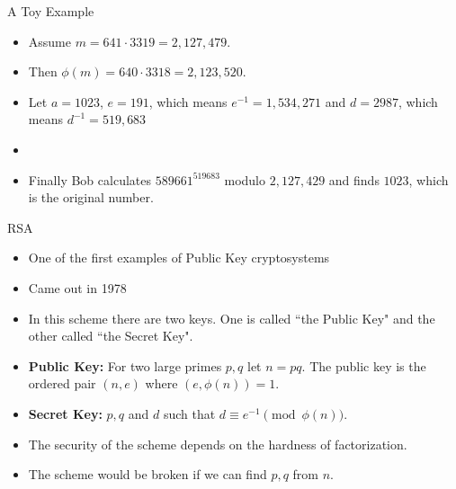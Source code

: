 \documentclass[ %
 usenames,dvipsnames,
aspectratio=169,11pt ]{beamer}
\newenvironment{stepitemize}{\begin{itemize}[<+->]}{\end{itemize} }
\begin{document}
\begin{frame}{A Toy Example}
\begin{stepitemize}
\item Assume $m= 641\cdot 3319=2,127,479.$
\item Then $\phi(m)=640\cdot 3318=2,123,520.$
\item Let $a=1023$, $e=191$, which means $e^{-1} = 1,534,271$ and $d=2987$, which means $d^{-1} = 519,683$
\item[]
\begin{center}
\end{center}
\item Finally Bob calculates $589661^{519683}$ modulo $2,127,429$ and finds $1023$, which is the original number.
\end{stepitemize}
\end{frame}

\begin{frame}{RSA}
\begin{stepitemize}
    \item One of the first examples of Public Key cryptosystems
    \item Came out in 1978
    \item In this scheme there are two keys. One is called ``the Public Key" and the other called ``the Secret Key".
    \item {\bf Public Key:} For two large primes $p, q$ let $n=pq$. The public key is the ordered pair $(n,e)$ where $(e, \phi(n))=1$.
    \item {\bf Secret Key:} $p, q$ and $d$ such that $d\equiv e^{-1} \pmod{\phi(n)}$.
    \item The security of the scheme depends on the hardness of factorization.
    \item The scheme would be broken if we can find $p, q$ from $n$.
    \end{stepitemize}
    \end{frame}
\end{document}
